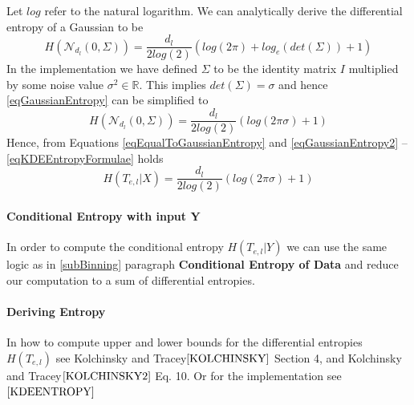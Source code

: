 \documentclass[dissertation.tex]{subfiles}
\begin{document}
Let $log$ refer to the natural logarithm. We can analytically derive the
differential entropy of a Gaussian to be
\begin{equation}
  H(\mathcal{N}_{d_l}(0, \Sigma))
  =
  \frac{d_l}{2log(2)}(log(2\pi) + log_e({det(\Sigma)})+1)
  \label{eqGaussianEntropy}
\end{equation}
In the implementation we have defined $\Sigma$ to be the identity matrix $I$
multiplied by some noise value $\sigma^2\in\mathbb{R}$. This implies
$det(\Sigma)=\sigma$ and hence \autoref{eqGaussianEntropy} can be simplified to
\begin{equation}
  H(\mathcal{N}_{d_l}(0, \Sigma))
  =
  \frac{d_l}{2log(2)}(log(2\pi\sigma)+1)
  \label{eqGaussianEntropy2}
\end{equation}
Hence, from Equations \ref{eqEqualToGaussianEntropy} and
\ref{eqGaussianEntropy2} -- \autoref{eqKDEEntropyFormulae} holds
\begin{equation}
  H(T_{e,l}|X)
  =
  \frac{d_l}{2log(2)}(log(2\pi\sigma)+1)
  \label{eqKDEEntropyFormulae}
\end{equation}

\paragraph{Conditional Entropy with input Y}
In order to compute the conditional entropy $H(T_{e,l}|Y)$ we can use the same
logic as in \autoref{subBinning} paragraph \textbf{Conditional Entropy of Data}
and reduce our computation to a sum of differential entropies.

\paragraph{Deriving Entropy}
In how to compute upper and lower bounds for the differential entropies
$H(T_{e,l})$ see Kolchinsky and Tracey$\cite{KOLCHINSKY}$ Section 4, and
Kolchinsky and Tracey$\cite{KOLCHINSKY2}$ Eq. 10. Or for the implementation
see$\cite{KDEENTROPY}$

\newpage
\end{document}
